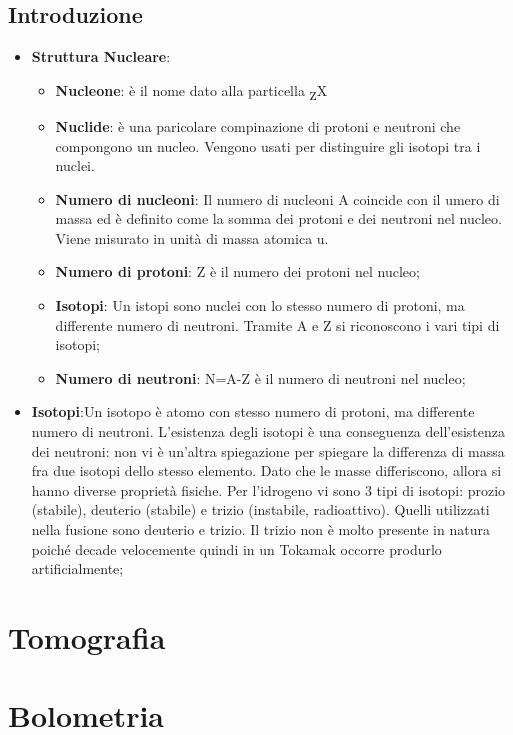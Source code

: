 \documentclass{article}
\def\SPSB#1#2{\rlap{\textsuperscript{\textcolor{black}{#1}}}\SB{#2}}
\def\SB#1{\textsubscript{\textcolor{black}{#1}}}
\begin{document}
\subsection{Introduzione}
\begin{itemize}
    \item \textbf{Struttura Nucleare}:\begin{itemize}
        \item \textbf{Nucleone}: è il nome dato alla particella \SPSB{A}{Z}X
        \item \textbf{Nuclide}: è una paricolare compinazione di protoni e neutroni che compongono un nucleo. Vengono usati per distinguire gli isotopi tra i nuclei.
        \item \textbf{Numero di nucleoni}: Il numero di nucleoni A coincide con il umero di massa ed è definito come la somma dei protoni e dei neutroni nel nucleo. Viene misurato in unità di massa atomica u.
        \item \textbf{Numero di protoni}: Z è il numero dei protoni nel nucleo;
        \item \textbf{Isotopi}: Un istopi sono nuclei con lo stesso numero di protoni, ma differente numero di neutroni. Tramite A e Z si riconoscono i vari tipi di isotopi;
        \item \textbf{Numero di neutroni}: N=A-Z è il numero di neutroni nel nucleo;
    \end{itemize}
    \item\textbf{Isotopi}:Un isotopo è atomo con stesso numero di protoni, ma differente numero di neutroni. L'esistenza degli isotopi è una conseguenza dell'esistenza dei neutroni: non vi è un'altra spiegazione per spiegare la differenza di massa fra due isotopi dello stesso elemento. Dato che le masse differiscono, allora si hanno diverse proprietà fisiche.\newline
    Per l'idrogeno vi sono 3 tipi di isotopi: prozio (stabile), deuterio (stabile) e trizio (instabile, radioattivo). Quelli utilizzati nella fusione sono deuterio e trizio. Il trizio non è molto presente in natura poiché decade velocemente quindi in un Tokamak occorre produrlo artificialmente;
   
\end{itemize}
\section{Tomografia}
\section{Bolometria}
\end{document}

